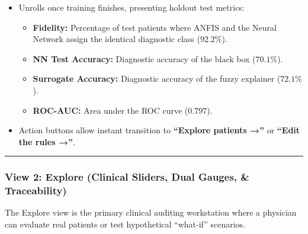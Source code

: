 \begin{itemize}
  \begin{itemize}
  \tightlist
  \item
    Unrolls once training finishes, presenting holdout test metrics:

    \begin{itemize}
    \tightlist
    \item
      \textbf{Fidelity:} Percentage of test patients where ANFIS and the
      Neural Network assign the identical diagnostic class (\(92.2\%\)).
    \item
      \textbf{NN Test Accuracy:} Diagnostic accuracy of the black box
      (\(70.1\%\)).
    \item
      \textbf{Surrogate Accuracy:} Diagnostic accuracy of the fuzzy
      explainer (\(72.1\%\)).
    \item
      \textbf{ROC-AUC:} Area under the ROC curve (\(0.797\)).
    \end{itemize}
  \item
    Action buttons allow instant transition to \textbf{``Explore
    patients →''} or \textbf{``Edit the rules →''}.
  \end{itemize}
\end{itemize}

\begin{center}\rule{0.5\linewidth}{0.5pt}\end{center}

\subsubsection{View 2: Explore (Clinical Sliders, Dual Gauges, \&
Traceability)}\label{view-2-explore-clinical-sliders-dual-gauges-traceability}

The Explore view is the primary clinical auditing workstation where a
physician can evaluate real patients or test hypothetical ``what-if''
scenarios.

